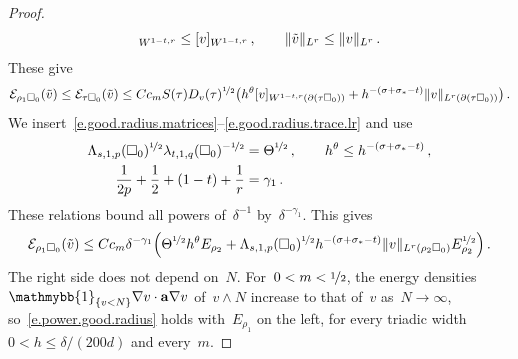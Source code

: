\documentclass[11pt,letterpaper]{article}
\numberwithin{equation}{section}
\theoremstyle{definition}
\renewcommand{\a}{\mathbf{a}}
\newcommand{\nf}{\nicefrac}
\newcommand{\cu}{\square}
\DeclarePairedDelimiter{\norm}{\lVert}{\rVert}
\newcommand{\indc}{{\mathmybb{1}}}
\newcommand{\Ener}{\mathcal E}
\begin{document}
\begin{proof}
\begin{equation*}
	[\tilde v]_{W^{1-t,r}}\leq[v]_{W^{1-t,r}}\,,\qquad\norm{\tilde v}_{L^r}\leq\norm{v}_{L^r}\,.
\end{equation*}
These give
\begin{equation*}
	\Ener_{\rho_1\cu_0}(\tilde v)\leq\Ener_{\tau\cu_0}(\tilde v)\leq Cc_mS(\tau)D_v(\tau)^{\nf12}\bigl(h^\theta[v]_{W^{1-t,r}(\partial(\tau\cu_0))}+h^{-(\sigma+\sigma_*-t)}\norm{v}_{L^r(\partial(\tau\cu_0))}\bigr)\,.
\end{equation*}
We insert~\eqref{e.good.radius.matrices}--\eqref{e.good.radius.trace.lr} and use
\begin{align*}
	\Lambda_{s,1,p}(\cu_0)^{\nf12}\lambda_{t,1,q}(\cu_0)^{-\nf12}&=\Theta^{\nf12}\,,\qquad h^\theta\leq h^{-(\sigma+\sigma_*-t)}\,,\\
	\frac1{2p}+\frac12+(1-t)+\frac1r&=\gamma_1\,.
\end{align*}
These relations bound all powers of~$\delta^{-1}$ by~$\delta^{-\gamma_1}$. This gives
\begin{equation}
	\Ener_{\rho_1\cu_0}(\tilde v)\leq Cc_m\delta^{-\gamma_1}\Bigl(\Theta^{\nf12}h^\theta E_{\rho_2}+\Lambda_{s,1,p}(\cu_0)^{\nf12}h^{-(\sigma+\sigma_*-t)}\norm{v}_{L^r(\rho_2\cu_0)}E_{\rho_2}^{\nf12}\Bigr)\,.
	\label{e.power.good.radius}
\end{equation}
The right side does not depend on~$N$. For~$0<m<\nf12$, the energy densities~$\indc_{\{v<N\}}\nabla v\cdot\a\nabla v$ of~$v\wedge N$ increase to that of~$v$ as~$N\to\infty$, so~\eqref{e.power.good.radius} holds with~$E_{\rho_1}$ on the left, for every triadic width~$0<h\leq\delta/(200d)$ and every~$m$.

\smallskip


\end{proof}
\end{document}
